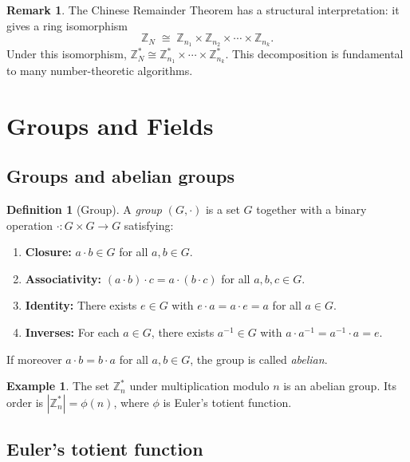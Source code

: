 \documentclass[twoside,12pt]{book}
\theoremstyle{plain}
\theoremstyle{definition}
\newtheorem{definition}[theorem]{Definition}
\newtheorem{example}[theorem]{Example}
\newtheorem{remark}[theorem]{Remark}
\theoremstyle{remark}
\begin{document}
\begin{remark}
The Chinese Remainder Theorem has a structural interpretation: it gives a ring isomorphism
\[
\mathbb{Z}_N \;\cong\; \mathbb{Z}_{n_1} \times \mathbb{Z}_{n_2} \times \cdots \times \mathbb{Z}_{n_k}.
\]
Under this isomorphism, $\mathbb{Z}_N^* \cong \mathbb{Z}_{n_1}^* \times \cdots \times \mathbb{Z}_{n_k}^*$. This decomposition is fundamental to many number-theoretic algorithms.
\end{remark}

\section{Groups and Fields}
\label{sec:groups-fields}

\subsection{Groups and abelian groups}

\begin{definition}[Group]
A \emph{group} $(G, \cdot)$ is a set $G$ together with a binary operation $\cdot : G \times G \to G$ satisfying:
\begin{enumerate}[nosep]
    \item \textbf{Closure:} $a \cdot b \in G$ for all $a, b \in G$.
    \item \textbf{Associativity:} $(a \cdot b) \cdot c = a \cdot (b \cdot c)$ for all $a, b, c \in G$.
    \item \textbf{Identity:} There exists $e \in G$ with $e \cdot a = a \cdot e = a$ for all $a \in G$.
    \item \textbf{Inverses:} For each $a \in G$, there exists $a^{-1} \in G$ with $a \cdot a^{-1} = a^{-1} \cdot a = e$.
\end{enumerate}
If moreover $a \cdot b = b \cdot a$ for all $a, b \in G$, the group is called \emph{abelian}.
\end{definition}

\begin{example}
The set $\mathbb{Z}_n^*$ under multiplication modulo $n$ is an abelian group. Its order is $|\mathbb{Z}_n^*| = \phi(n)$, where $\phi$ is Euler's totient function.
\end{example}

\subsection{Euler's totient function}
\end{document}
